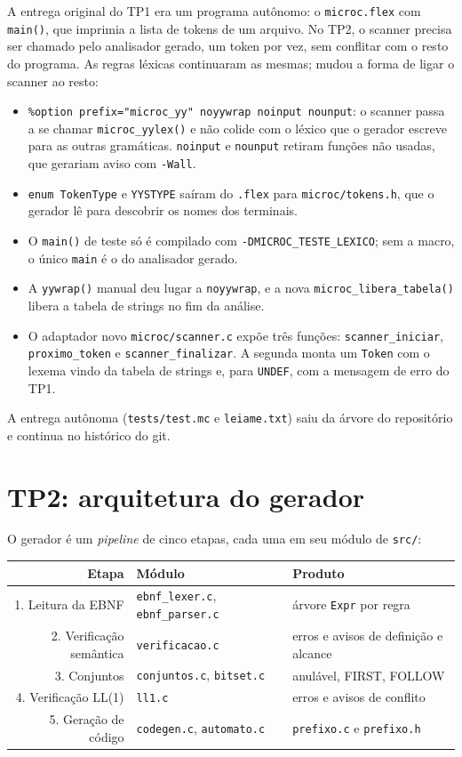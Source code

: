\documentclass[11pt,a4paper]{article}
\begin{document}
A entrega original do TP1 era um programa autônomo: o \texttt{microc.flex} com \texttt{main()},
que imprimia a lista de tokens de um arquivo. No TP2, o scanner precisa ser chamado pelo
analisador gerado, um token por vez, sem conflitar com o resto do programa. As regras léxicas
continuaram as mesmas; mudou a forma de ligar o scanner ao resto:
\begin{itemize}
\item \texttt{\%option prefix="microc\_yy" noyywrap noinput nounput}: o scanner passa a se chamar
  \texttt{microc\_yylex()} e não colide com o léxico que o gerador escreve para as outras
  gramáticas. \texttt{noinput} e \texttt{nounput} retiram funções não usadas, que gerariam aviso
  com \texttt{-Wall}.
\item \texttt{enum TokenType} e \texttt{YYSTYPE} saíram do \texttt{.flex} para
  \texttt{microc/tokens.h}, que o gerador lê para descobrir os nomes dos terminais.
\item O \texttt{main()} de teste só é compilado com \texttt{-DMICROC\_TESTE\_LEXICO}; sem a
  macro, o único \texttt{main} é o do analisador gerado.
\item A \texttt{yywrap()} manual deu lugar a \texttt{noyywrap}, e a nova
  \texttt{microc\_libera\_tabela()} libera a tabela de strings no fim da análise.
\item O adaptador novo \texttt{microc/scanner.c} expõe três funções: \texttt{scanner\_iniciar},
  \texttt{proximo\_token} e \texttt{scanner\_finalizar}. A segunda monta um \texttt{Token} com o
  lexema vindo da tabela de strings e, para \texttt{UNDEF}, com a mensagem de erro do TP1.
\end{itemize}
A entrega autônoma (\texttt{tests/test.mc} e \texttt{leiame.txt}) saiu da árvore do repositório e
continua no histórico do git.

\section{TP2: arquitetura do gerador}

O gerador é um \emph{pipeline} de cinco etapas, cada uma em seu módulo de \texttt{src/}:

\begin{center}
\small
\begin{tabular}{@{}rll@{}}
\toprule
Etapa & Módulo & Produto \\
\midrule
1. Leitura da EBNF & \texttt{ebnf\_lexer.c}, \texttt{ebnf\_parser.c} & árvore \texttt{Expr} por regra \\
2. Verificação semântica & \texttt{verificacao.c} & erros e avisos de definição e alcance \\
3. Conjuntos & \texttt{conjuntos.c}, \texttt{bitset.c} & anulável, FIRST, FOLLOW \\
4. Verificação LL(1) & \texttt{ll1.c} & erros e avisos de conflito \\
5. Geração de código & \texttt{codegen.c}, \texttt{automato.c} & \texttt{prefixo.c} e \texttt{prefixo.h} \\
\bottomrule
\end{tabular}
\end{center}
\end{document}

